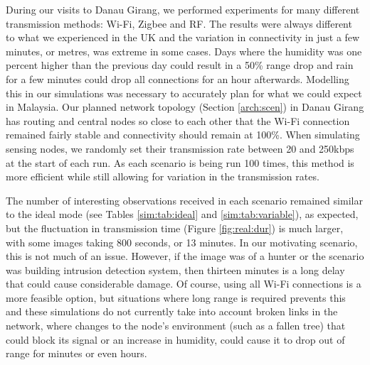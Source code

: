 During our visits to Danau Girang, we performed experiments for many different transmission methods: Wi-Fi, Zigbee and RF. The results were always different to what we experienced in the UK and the variation in connectivity in just a few minutes, or metres, was extreme in some cases. Days where the humidity was one percent higher than the previous day could result in a 50\% range drop and rain for a few minutes could drop all connections for an hour afterwards. Modelling this in our simulations was necessary to accurately plan for what we could expect in Malaysia. Our planned network topology (Section \ref{arch:scen}) in Danau Girang has routing and central nodes so close to each other that the Wi-Fi connection remained fairly stable and connectivity should remain at 100\%. When simulating sensing nodes, we randomly set their transmission rate between 20 and 250kbps at the start of each run. As each scenario is being run 100 times, this method is more efficient while still allowing for variation in the transmission rates. 

The number of interesting observations received in each scenario remained similar to the ideal mode (see Tables \ref{sim:tab:ideal} and \ref{sim:tab:variable}), as expected, but the fluctuation in transmission time (Figure \ref{fig:real:dur}) is much larger, with some images taking 800 seconds, or 13 minutes. In our motivating scenario, this is not much of an issue. However, if the image was of a hunter or the scenario was building intrusion detection system, then thirteen minutes is a long delay that could cause considerable damage. Of course, using all Wi-Fi connections is a more feasible option, but situations where long range is required prevents this and these simulations do not currently take into account broken links in the network, where changes to the node's environment (such as a fallen tree) that could block its signal or an increase in humidity, could cause it to drop out of range for minutes or even hours. 

